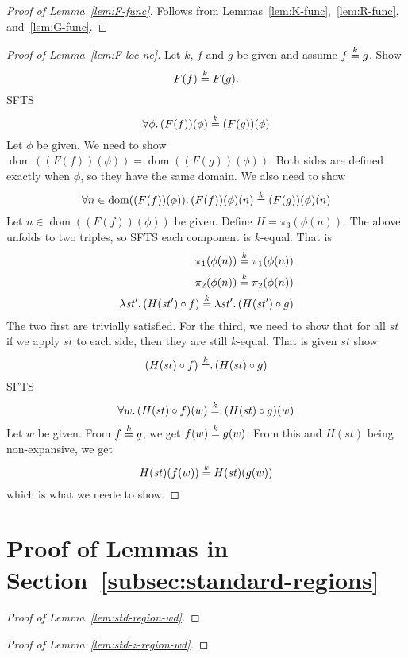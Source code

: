 \documentclass{article}
\newcommand{\nequal}[1][n]{\stackrel{\tiny{#1}}{=}}
\DeclareMathOperator{\dom}{dom}
\newcommand{\var}[1]{\mathit{#1}}
\begin{document}
\begin{proof}[Proof of Lemma~\ref{lem:F-func}]
Follows from Lemmas~\ref{lem:K-func},~\ref{lem:R-func}, and~\ref{lem:G-func}.
\end{proof}

\begin{proof}[Proof of Lemma~\ref{lem:F-loc-ne}]
Let $k$, $f$ and $g$ be given and assume $f \nequal[k] g$. Show
\[
F(f) \nequal[k] F(g).
\]
SFTS
\[
\forall \phi \ldotp (F(f))(\phi) \nequal[k] (F(g))(\phi)
\]
Let $\phi$ be given. We need to show $\dom((F(f))(\phi)) = \dom((F(g))(\phi))$. Both sides are defined exactly when $\phi$, so they have the same domain. We also need to show
\[
\forall n \in \dom((F(f))(\phi))\ldotp (F(f))(\phi)(n) \nequal[k] (F(g))(\phi)(n)
\]
Let $n \in  \dom((F(f))(\phi))$ be given. Define $H = \pi_3 (\phi(n))$. The above unfolds to two triples, so SFTS each component is $k$-equal. That is
\begin{align*}
  \pi_1(\phi(n)) \nequal[k] \pi_1(\phi(n))\\
  \pi_2(\phi(n)) \nequal[k] \pi_2(\phi(n))\\
  \lambda \var{st}'\ldotp (H(\var{st}') \circ f) \nequal[k]   \lambda \var{st}'\ldotp (H(\var{st}') \circ g)
\end{align*}
The two first are trivially satisfied. For the third, we need to show that for all $\var{st}$ if we apply $\var{st}$ to each side, then they are still $k$-equal. That is given $\var{st}$ show
\[
  (H(\var{st}) \circ f) \nequal[k]   \ldotp (H(\var{st}) \circ g)
\]
SFTS
\[
\forall w \ldotp (H(\var{st}) \circ f)(w) \nequal[k]   \ldotp (H(\var{st}) \circ g)(w)
\]
Let $w$ be given. From $f \nequal[k] g$, we get $f(w) \nequal[k] g(w)$. From this and $H(st)$ being non-expansive, we get
\[
  H(\var{st})(f(w)) \nequal[k]   H(\var{st})(g(w))
\]
which is what we neede to show.

\end{proof}

\section{Proof of Lemmas in Section~\ref{subsec:standard-regions}}
\begin{proof}[Proof of Lemma~\ref{lem:std-region-wd}]
\end{proof}

\begin{proof}[Proof of Lemma~\ref{lem:std-z-region-wd}]
\end{proof}
\end{document}
